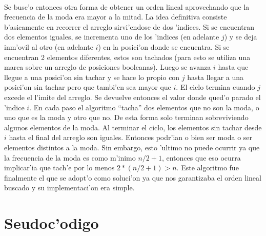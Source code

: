 \paragraph{}
Se busc'o entonces otra forma de  obtener un orden lineal aprovechando que la frecuencia de la moda 
era mayor a la mitad. La idea definitiva consiste b'asicamente en recorrer el  arreglo sirvi'endose de 
dos 'indices. Si se encuentran dos elementos iguales, se incrementa uno de los 'indices (en adelante $j$) 
y se deja inm'ovil al otro (en adelante $i$) en la posici'on donde se encuentra. Si se encuentran 2 
elementos diferentes, estos son tachados (para esto se utiliza una marca sobre un arreglo de posiciones booleanas). 
Luego se avanza $i$ hasta que llegue a una posici'on sin tachar y se hace lo propio con $j$ hasta llegar 
a una posici'on sin tachar pero que tambi'en sea mayor que $i$. El ciclo termina cuando $j$ excede el l'imite 
del arreglo. Se devuelve entonces el valor donde qued'o parado el 'indice $i$. 
En cada paso el algoritmo ``tacha'' dos elementos que no son la moda, o uno que es la moda y otro que no. 
De esta forma solo terminan sobreviviendo algunos elementos de la moda. Al terminar el ciclo, los elementos
sin tachar desde $i$ hasta el final del arreglo son iguales. Entonces podr'ian o bien ser moda o ser elementos 
distintos a la moda. Sin embargo, esto 'ultimo no puede ocurrir ya que la frecuencia de la moda es como m'inimo 
$n/2+1$, entonces que eso ocurra implicar'ia que tach'e por lo menos $2*(n/2+1) > n$. Este algoritmo 
fue finalmente el que se adopt'o como soluci'on ya que nos garantizaba el orden lineal buscado y su implementaci'on 
era simple.

\section{Seudoc'odigo}
\newpage



